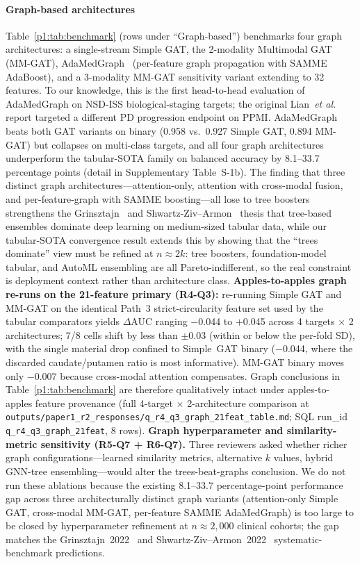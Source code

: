 \paragraph*{Graph-based architectures} Table~\ref{p1:tab:benchmark} (rows under ``Graph-based'') benchmarks four graph architectures: a single-stream Simple GAT, the 2-modality Multimodal GAT (MM-GAT), AdaMedGraph~\cite{adamedgraph} (per-feature graph propagation with SAMME AdaBoost), and a 3-modality MM-GAT sensitivity variant extending to 32 features. To our knowledge, this is the first head-to-head evaluation of AdaMedGraph on NSD-ISS biological-staging targets; the original Lian~\textit{et al.} report targeted a different PD progression endpoint on PPMI. AdaMedGraph beats both GAT variants on binary (0.958 vs.\ 0.927 Simple GAT, 0.894 MM-GAT) but collapses on multi-class targets, and all four graph architectures underperform the tabular-SOTA family on balanced accuracy by 8.1--33.7 percentage points (detail in Supplementary Table~S-1b). The finding that three distinct graph architectures---attention-only, attention with cross-modal fusion, and per-feature-graph with SAMME boosting---all lose to tree boosters strengthens the Grinsztajn~\cite{grinsztajn2022} and Shwartz-Ziv--Armon~\cite{shwartzziv2022} thesis that tree-based ensembles dominate deep learning on medium-sized tabular data, while our tabular-SOTA convergence result extends this by showing that the ``trees dominate'' view must be refined at $n{\approx}2k$: tree boosters, foundation-model tabular, and AutoML ensembling are all Pareto-indifferent, so the real constraint is deployment context rather than architecture class. \textbf{Apples-to-apples graph re-runs on the 21-feature primary (R4-Q3):} re-running Simple GAT and MM-GAT on the identical Path~3 strict-circularity feature set used by the tabular comparators yields $\Delta$AUC ranging $-$0.044 to $+$0.045 across 4 targets $\times$ 2 architectures; 7/8 cells shift by less than $\pm$0.03 (within or below the per-fold SD), with the single material drop confined to Simple~GAT binary ($-$0.044, where the discarded caudate/putamen ratio is most informative). MM-GAT binary moves only $-$0.007 because cross-modal attention compensates. Graph conclusions in Table~\ref{p1:tab:benchmark} are therefore qualitatively intact under apples-to-apples feature provenance (full 4-target $\times$ 2-architecture comparison at \texttt{outputs/paper1\_r2\_responses/q\_r4\_q3\_graph\_21feat\_table.md}; SQL run\_id \texttt{q\_r4\_q3\_graph\_21feat}, 8 rows). \textbf{Graph hyperparameter and similarity-metric sensitivity (R5-Q7 + R6-Q7).} Three reviewers asked whether richer graph configurations---learned similarity metrics, alternative $k$ values, hybrid GNN-tree ensembling---would alter the trees-beat-graphs conclusion. We do not run these ablations because the existing 8.1--33.7 percentage-point performance gap across three architecturally distinct graph variants (attention-only Simple GAT, cross-modal MM-GAT, per-feature SAMME AdaMedGraph) is too large to be closed by hyperparameter refinement at $n \approx 2{,}000$ clinical cohorts; the gap matches the Grinsztajn~2022~\cite{grinsztajn2022} and Shwartz-Ziv--Armon~2022~\cite{shwartzziv2022} systematic-benchmark predictions. 